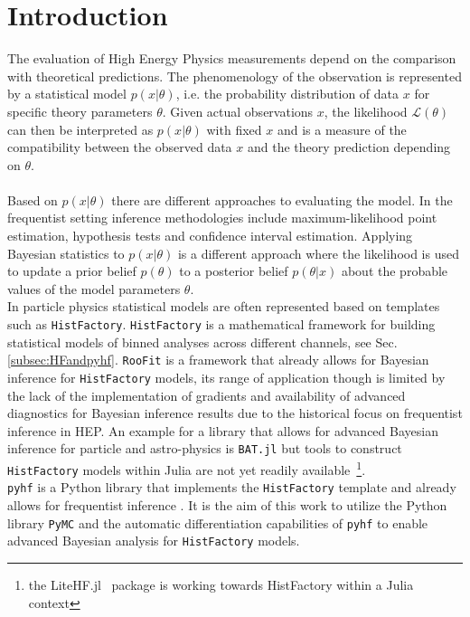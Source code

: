 \section{Introduction}\label{sec:introduction}

The evaluation of High Energy Physics measurements depend on the comparison with theoretical predictions. The phenomenology of the observation is represented by a statistical model $p(x | \theta)$, i.e. the probability distribution of data $x$ for specific theory parameters $\theta$.
Given actual observations $x$, the likelihood $\mathcal{L}(\theta)$ can then be interpreted as $p(x | \theta)$ with fixed $x$ and is a measure of the compatibility between the observed data $x$ and the theory prediction depending on $\theta$.   \\ \\
Based on $p(x | \theta)$ there are different approaches to evaluating the model. In the frequentist setting inference methodologies include maximum-likelihood point estimation, hypothesis tests and confidence interval estimation. Applying Bayesian statistics to $p(x | \theta)$ is a different approach where the likelihood is used to update a prior belief $p(\theta)$ to a posterior belief $p(\theta|x)$ about the probable values of the model parameters $\theta$. \\
In particle physics statistical models are often represented based on templates such as \texttt{HistFactory}. \texttt{HistFactory} is a mathematical framework for building statistical models of binned analyses across different channels, see Sec. \ref{subsec:HFandpyhf}. \texttt{RooFit} \cite{root} is a framework that already allows for Bayesian inference for \texttt{HistFactory} models, its range of application though is limited by the lack of the implementation of gradients and availability of advanced diagnostics for Bayesian inference results due to the historical focus on frequentist inference in HEP. An example for a library that allows for advanced Bayesian inference for particle and astro-physics is \texttt{BAT.jl} \cite{Schulz:2021BAT} but tools to construct \texttt{HistFactory} models within Julia are not yet readily available~\footnote{the LiteHF.jl~\cite{LiteHF} package is working towards HistFactory within a Julia context }. \\
\texttt{pyhf} is a Python library that implements the \texttt{HistFactory} template and already allows for frequentist inference \cite{pyhf, pyhf_joss}. It is the aim of this work to utilize the Python library \texttt{PyMC} and the automatic differentiation capabilities of \texttt{pyhf} to enable advanced Bayesian analysis for \texttt{HistFactory} models.
